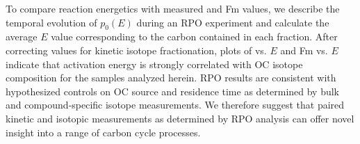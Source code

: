 To compare reaction energetics with measured  and Fm values, we describe the temporal evolution of $p_{0}(E)$ during an RPO experiment and calculate the average $E$ value corresponding to the carbon contained in each fraction. After correcting  values for kinetic isotope fractionation, plots of  vs. $E$ and Fm vs. $E$ indicate that activation energy is strongly correlated with OC isotope composition for the samples analyzed herein. RPO results are consistent with hypothesized controls on OC source and residence time as determined by bulk and compound-specific isotope measurements. We therefore suggest that paired kinetic and isotopic measurements as determined by RPO analysis can offer novel insight into a range of carbon cycle processes.



























